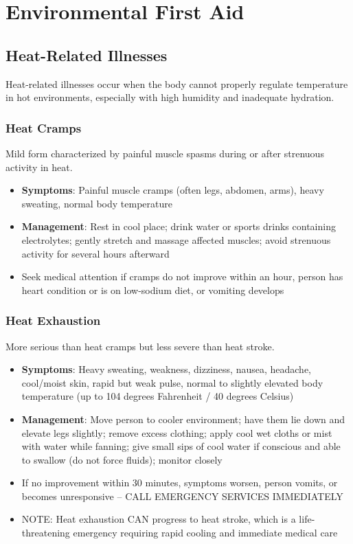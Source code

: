 \chapter{Environmental First Aid}\label{ch:environmental}

\section{Heat-Related Illnesses}

Heat-related illnesses occur when the body cannot properly regulate temperature in hot environments, especially with high humidity and inadequate hydration.

\subsection{Heat Cramps}

Mild form characterized by painful muscle spasms during or after strenuous activity in heat.

\begin{itemize}[leftmargin=*]
  \item \textbf{Symptoms}: Painful muscle cramps (often legs, abdomen, arms), heavy sweating, normal body temperature
  \item \textbf{Management}: Rest in cool place; drink water or sports drinks containing electrolytes; gently stretch and massage affected muscles; avoid strenuous activity for several hours afterward
  \item Seek medical attention if cramps do not improve within an hour, person has heart condition or is on low-sodium diet, or vomiting develops
\end{itemize}

\subsection{Heat Exhaustion}

More serious than heat cramps but less severe than heat stroke.

\begin{itemize}[leftmargin=*]
  \item \textbf{Symptoms}: Heavy sweating, weakness, dizziness, nausea, headache, cool/moist skin, rapid but weak pulse, normal to slightly elevated body temperature (up to 104 degrees Fahrenheit / 40 degrees Celsius)
  \item \textbf{Management}: Move person to cooler environment; have them lie down and elevate legs slightly; remove excess clothing; apply cool wet cloths or mist with water while fanning; give small sips of cool water if conscious and able to swallow (do not force fluids); monitor closely
  \item If no improvement within 30 minutes, symptoms worsen, person vomits, or becomes unresponsive -- CALL EMERGENCY SERVICES IMMEDIATELY
  \item NOTE: Heat exhaustion CAN progress to heat stroke, which is a life-threatening emergency requiring rapid cooling and immediate medical care
\end{itemize}

